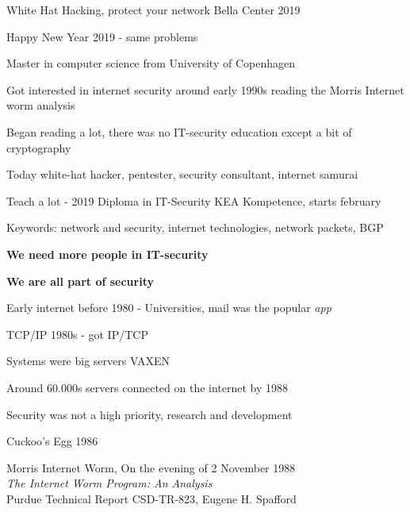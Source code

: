 \documentclass[Screen16to9,17pt,footrule]{foils}
\begin{document}
\mytitlepage
{White Hat Hacking, protect your network}
{Bella Center 2019}

\centerline{Happy New Year 2019 - same problems}



\begin{list2}
\item Master in computer science from University of Copenhagen
\item Got interested in internet security around early 1990s reading the Morris Internet worm analysis
\item Began reading a lot, there was no IT-security education except a bit of cryptography
\item Today white-hat hacker, pentester, security consultant, internet samurai
\item Teach a lot - 2019 Diploma in IT-Security KEA Kompetence, starts february
\item Keywords: network and security, internet technologies, network packets, BGP
\item {\bf We need more people in IT-security}
\end{list2}

\vskip 5mm
\centerline{\bf\Large We are all part of security}


\begin{list1}
\item Early internet before 1980 - Universities, mail was the popular \emph{app}
\item TCP/IP 1980s - got IP/TCP
\item Systems were big servers VAXEN
\item Around 60.000s servers connected on the internet by 1988
\item Security was not a high priority, research and development
\begin{list2}
\item Cuckoo's Egg 1986
\item Morris Internet Worm, On the evening of 2 November 1988\\
\emph{The Internet Worm Program: An Analysis}\\
Purdue Technical Report CSD-TR-823, Eugene H. Spafford
\end{list2}
\end{list1}


\end{document}
